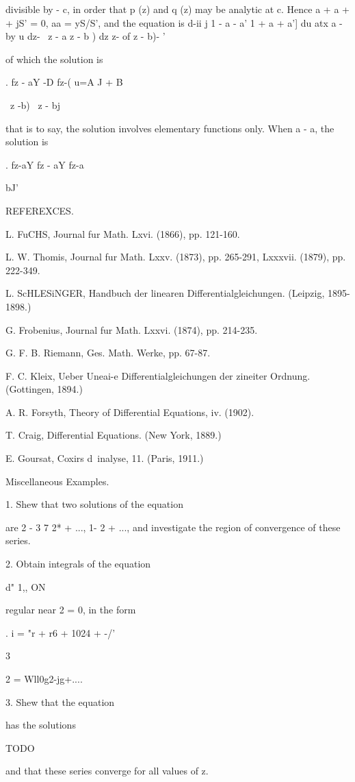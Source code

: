 divisible by - c, in order that p (z) and q (z) may be analytic at c.
Hence a + a + + jS' = 0, aa = yS/S', and the equation is d-ii j 1 - a
- a' 1 + a + a'] du atx a - by u dz- \ z - a z - b ) dz z- of z - b)-
'

of which the solution is

. fz - aY -D fz-( u=A J + B

\ z -b) \ z - bj

that is to say, the solution involves elementary functions only. When
a - a, the solution is

. fz-aY fz - aY fz-a

bJ'

REFEREXCES.

L. FuCHS, Journal fur Math. Lxvi. (1866), pp. 121-160.

L. W. Thomis, Journal fur Math. Lxxv. (1873), pp. 265-291, Lxxxvii.
(1879), pp. 222-349.

L. ScHLESiNGER, Handbuch der linearen Differentialgleichungen.
(Leipzig, 1895-1898.)

G. Frobenius, Journal fur Math. Lxxvi. (1874), pp. 214-235.

G. F. B. Riemann, Ges. Math. Werke, pp. 67-87.

F. C. Kleix, Ueber Uneai-e Differentialgleichungen der zineiter
Ordnung. (Gottingen, 1894.)

A. R. Forsyth, Theory of Differential Equations, iv. (1902).

T. Craig, Differential Equations. (New York, 1889.)

E. Goursat, Coxirs d\ inalyse, 11. (Paris, 1911.)

%
%

Miscellaneous Examples.

1. Shew that two solutions of the equation

are 2 - 3 7 2* + ..., 1- 2 + ..., and investigate the region of
convergence of these series.

2. Obtain integrals of the equation

d" 1,, ON

regular near 2 = 0, in the form

. i = "r + r6 + 1024 + -/'

3

 2 = Wll0g2-jg+....

3. Shew that the equation

has the solutions

TODO

and that these series converge for all values of z.

